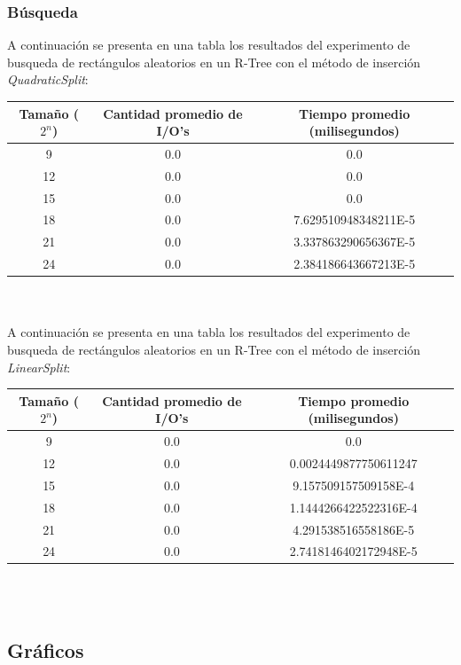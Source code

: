 \documentclass[letterpaper,12pt]{article}
\begin{document}
\subsubsection{Búsqueda}
A continuación se presenta en una tabla los resultados del experimento de busqueda de rectángulos aleatorios en un R-Tree con el método de inserción \textit{QuadraticSplit}: \\
\begin{tabular}{|c|c|c|}
\hline
\textbf{Tama\~no ($2^n$)} & \textbf{Cantidad promedio de I/O's} & \textbf{Tiempo promedio (milisegundos)} \\
\hline
9 & 0.0 & 0.0 \\
\hline
12 & 0.0 & 0.0 \\
\hline
15 & 0.0 & 0.0 \\
\hline
18 & 0.0 & 7.629510948348211E-5 \\
\hline
21 & 0.0 & 3.337863290656367E-5 \\
\hline
24 & 0.0 & 2.384186643667213E-5 \\
\hline
\end{tabular}
\\ \\

A continuación se presenta en una tabla los resultados del experimento de busqueda de rectángulos aleatorios en un R-Tree con el método de inserción \textit{LinearSplit}: \\
\begin{tabular}{|c|c|c|}
\hline
\textbf{Tama\~no ($2^n$)} & \textbf{Cantidad promedio de I/O's} & \textbf{Tiempo promedio (milisegundos)} \\
\hline
9 & 0.0 & 0.0 \\
\hline
12 & 0.0 & 0.0024449877750611247 \\
\hline
15 & 0.0 & 9.157509157509158E-4 \\
\hline
18 & 0.0 & 1.1444266422522316E-4 \\
\hline
21 & 0.0 & 4.291538516558186E-5 \\
\hline
24 & 0.0 & 2.7418146402172948E-5 \\
\hline
\end{tabular}
\\ \\




\newpage
\subsection{Gráficos}
\end{document}
